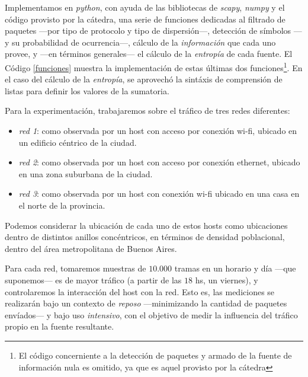 Implementamos en \textit{python}, con ayuda de las bibliotecas de \textit{scapy}, \textit{numpy} y el código provisto por la cátedra, una serie de funciones dedicadas al filtrado de paquetes ---por tipo de protocolo y tipo de dispersión---, detección de símbolos ---y su probabilidad de ocurrencia---, cálculo de la \textit{información} que cada uno provee, y ---en términos generales--- el cálculo de la \textit{entropía} de cada fuente. El Código \ref{funciones} muestra la implementación de estas últimas dos funciones\footnote{El código concerniente a la detección de paquetes y armado de la fuente de información nula es omitido, ya que es aquel provisto por la cátedra}. En el caso del cálculo de la \textit{entropía}, se aprovechó la sintáxis de comprensión de listas para definir los valores de la sumatoria.

\vspace{1em}


\vspace{1em}
Para la experimentación, trabajaremos sobre el tráfico de tres redes diferentes:

\begin{itemize}
    \item \textit{red 1}: como observada por un host con acceso por conexión wi-fi, ubicado en un edificio céntrico de la ciudad.
    \item \textit{red 2}: como observada por un host con acceso por conexión ethernet, ubicado en una zona suburbana de la ciudad.
    \item \textit{red 3}: como observada por un host con conexión wi-fi ubicado en una casa en el norte de la provincia.
\end{itemize}

Podemos considerar la ubicación de cada uno de estos hosts como ubicaciones dentro de distintos anillos concéntricos, en términos de densidad poblacional, dentro del área metropolitana de Buenos Aires.

Para cada red, tomaremos muestras de $10.000$ tramas en un horario y día ---que suponemos--- es de mayor tráfico (a partir de las $18$ hs, un viernes), y controlaremos la interacción del host con la red. Esto es, las mediciones se realizarán bajo un contexto de \textit{reposo} ---minimizando la cantidad de paquetes envíados--- y bajo uso \textit{intensivo}, con el objetivo de medir la influencia del tráfico propio en la fuente resultante. 

